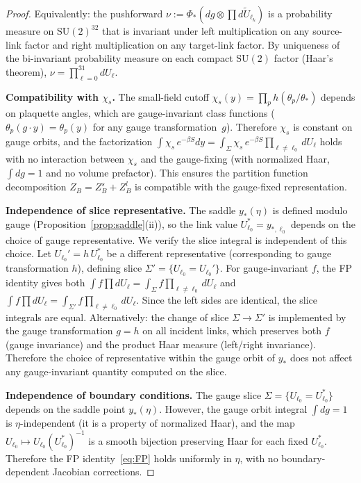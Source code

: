 \documentclass[11pt]{article}
\theoremstyle{definition}
\newcommand{\SU}{\mathrm{SU}}
\begin{document}
\begin{proof}
Equivalently: the pushforward $\nu:=\Phi_*(dg\otimes\prod d\widetilde{U}_{\ell_k})$
is a probability measure on $\SU(2)^{32}$ that is invariant under
left multiplication on any source-link factor and right multiplication
on any target-link factor.  By uniqueness of the bi-invariant
probability measure on each compact $\SU(2)$ factor (Haar's theorem),
$\nu=\prod_{\ell=0}^{31}dU_\ell$.

\textbf{Compatibility with $\chi_s$.}
The small-field cutoff $\chi_s(y)=\prod_p h(\theta_p/\theta_*)$
depends on plaquette angles, which are gauge-invariant class functions
($\theta_p(g\cdot y)=\theta_p(y)$ for any gauge transformation~$g$).
Therefore $\chi_s$ is constant on gauge orbits, and the factorization
$\int\chi_s\,e^{-\beta S}dy
=\int_\Sigma\chi_s\,e^{-\beta S}
\prod_{\ell\ne\ell_0}dU_\ell$ holds with no interaction between
$\chi_s$ and the gauge-fixing (with normalized Haar, $\int dg=1$ and
no volume prefactor).  This ensures the partition function
decomposition $Z_B=Z_B^s+Z_B^l$ is compatible with the gauge-fixed
representation.

\textbf{Independence of slice representative.}
The saddle $y_*(\eta)$ is defined modulo gauge
(Proposition~\ref{prop:saddle}(ii)), so the link value
$U_{\ell_0}^*=y_{*,\ell_0}$ depends on the choice of gauge
representative.  We verify the slice integral is independent
of this choice.  Let $U_{\ell_0}'=h\,U_{\ell_0}^*$ be a different
representative (corresponding to gauge transformation $h$), defining
slice $\Sigma'=\{U_{\ell_0}=U_{\ell_0}'\}$.  For gauge-invariant
$f$, the FP identity gives both
$\int f\prod dU_\ell=\int_\Sigma f\prod_{\ell\ne\ell_0}dU_\ell$
and
$\int f\prod dU_\ell=\int_{\Sigma'} f\prod_{\ell\ne\ell_0}dU_\ell$.
Since the left sides are identical, the slice integrals are equal.
Alternatively: the change of slice
$\Sigma\to\Sigma'$ is implemented by the gauge transformation
$g=h$ on all incident links, which preserves both $f$ (gauge
invariance) and the product Haar measure (left/right invariance).
Therefore the choice of representative within the gauge orbit
of $y_*$ does not affect any gauge-invariant quantity computed
on the slice.

\textbf{Independence of boundary conditions.}
The gauge slice $\Sigma=\{U_{\ell_0}=U_{\ell_0}^*\}$ depends on the
saddle point $y_*(\eta)$.  However, the gauge orbit integral
$\int dg=1$ is $\eta$-independent (it is a property of
normalized Haar), and the map
$U_{\ell_0}\mapsto U_{\ell_0}(U_{\ell_0}^*)^{-1}$ is a smooth
bijection preserving Haar for each fixed $U_{\ell_0}^*$.  Therefore
the FP identity~\eqref{eq:FP} holds uniformly in $\eta$, with no
boundary-dependent Jacobian corrections.
\end{proof}
\end{document}
